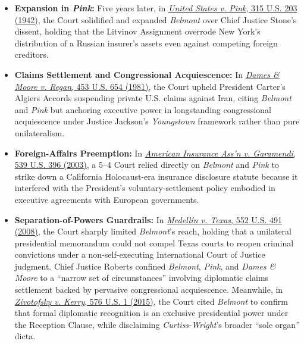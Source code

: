 \documentclass[12pt]{article}
\begin{document}
\begin{itemize}

\item \textbf{Expansion in \textit{Pink}:} Five years later, in \href{https://supreme.justia.com/cases/federal/us/315/203/}{\textit{United States v. Pink}, 315 U.S. 203 (1942)}, the Court solidified and expanded \textit{Belmont} over Chief Justice Stone's dissent, holding that the Litvinov Assignment overrode New York's distribution of a Russian insurer's assets even against competing foreign creditors.

\item \textbf{Claims Settlement and Congressional Acquiescence:} In \href{https://supreme.justia.com/cases/federal/us/453/654/}{\textit{Dames \& Moore v. Regan}, 453 U.S. 654 (1981)}, the Court upheld President Carter's Algiers Accords suspending private U.S. claims against Iran, citing \textit{Belmont} and \textit{Pink} but anchoring executive power in longstanding congressional acquiescence under Justice Jackson's \textit{Youngstown} framework rather than pure unilateralism.
  \item \textbf{Foreign-Affairs Preemption:} In \href{https://supreme.justia.com/cases/federal/us/539/396/}{\textit{American Insurance Ass'n v. Garamendi}, 539 U.S. 396 (2003)}, a 5--4 Court relied directly on \textit{Belmont} and \textit{Pink} to strike down a California Holocaust-era insurance disclosure statute because it interfered with the President's voluntary-settlement policy embodied in executive agreements with European governments.
  \item \textbf{Separation-of-Powers Guardrails:} In \href{https://supreme.justia.com/cases/federal/us/552/491/}{\textit{Medell\'in v. Texas}, 552 U.S. 491 (2008)}, the Court sharply limited \textit{Belmont}'s reach, holding that a unilateral presidential memorandum could not compel Texas courts to reopen criminal convictions under a non-self-executing International Court of Justice judgment. Chief Justice Roberts confined \textit{Belmont}, \textit{Pink}, and \textit{Dames \& Moore} to a ``narrow set of circumstances'' involving diplomatic claims settlement backed by pervasive congressional acquiescence. Meanwhile, in \href{https://supreme.justia.com/cases/federal/us/576/1/}{\textit{Zivotofsky v. Kerry}, 576 U.S. 1 (2015)}, the Court cited \textit{Belmont} to confirm that formal diplomatic recognition is an exclusive presidential power under the Reception Clause, while disclaiming \textit{Curtiss-Wright}'s broader ``sole organ'' dicta.

\end{itemize}
\end{document}
